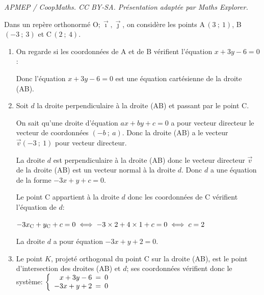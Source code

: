 \documentclass[10pt]{article}
\providecommand{\vect}[1]{\overrightarrow{#1}}
\providecommand{\Oij}{\(\mathrm{O};\vec{\imath},\vec{\jmath}\)}
\begin{document}
\noindent\textit{APMEP / CoopMaths. CC BY-SA. Présentation adaptée par Maths Explorer.}\par\medskip
\bigskip

Dans un repère orthonormé \Oij{}, on considère les points A\,$(3~;~1)$, B\,$(-3~;~3)$ et C\,$(2~;~4)$.

\begin{enumerate}
\item 
On regarde si les coordonnées de A et de B vérifient l'équation $x+3y-6=0$:


Donc  l'équation $x+3y-6=0$ est une équation cartésienne de la droite (AB).

\item Soit $d$ la droite perpendiculaire à la droite (AB) et passant par le point C.

On sait qu'une droite d'équation $ax+by+c=0$ a pour vecteur directeur le vecteur de coordonnées $(-b~;~a)$. Donc la droite (AB) a le vecteur $\vect{v}\left (-3~;~1\right )$ pour vecteur directeur.

La droite $d$ est perpendiculaire à la droite (AB) donc le vecteur directeur $\vect{v}$ de la droite (AB) est un vecteur normal à la droite $d$.
Donc $d$ a une équation de la forme $-3x+y+c=0$.

Le point C appartient à la droite $d$ donc les coordonnées de C vérifient l'équation de $d$:

$-3x_{\text C} + y_{\text C}+c=0
\iff
-3\times 2 + 4\times 1 +c=0
\iff c=2$

La droite $d$ a pour équation $-3x + y +2=0$.

\item Le point $K$, projeté orthogonal du point C sur la droite (AB), est le point d'intersection des droites (AB) et $d$; ses coordonnées vérifient donc le système:
$\left \lbrace
\begin{array}{r !{=} l}
x+3y-6 & 0\\
-3x+y+2 & 0
\end{array}
\right .$


\end{enumerate}
\end{document}
